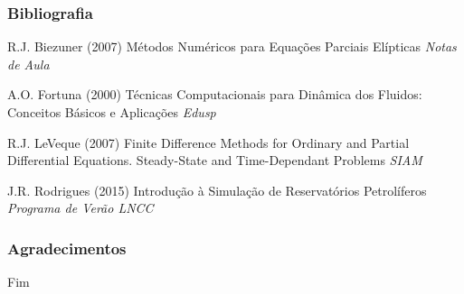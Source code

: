 \documentclass{beamer}
\begin{document}
\begin{frame}
\frametitle{Bibliografia}
\footnotesize{
\begin{thebibliography}{99} %
 R.J. Biezuner (2007)
\newblock Métodos Numéricos para Equações Parciais Elípticas
\newblock \emph{Notas de Aula}

 A.O. Fortuna (2000)
\newblock Técnicas Computacionais para Dinâmica dos Fluidos: Conceitos Básicos e Aplicações
\newblock \emph{Edusp}

 R.J. LeVeque (2007)
\newblock Finite Difference Methods for Ordinary and Partial Differential Equations. Steady-State and Time-Dependant Problems
\newblock \emph{SIAM}

 J.R. Rodrigues (2015)
\newblock Introdução à Simulação de Reservatórios Petrolíferos
\newblock \emph{Programa de Verão LNCC}
\end{thebibliography}
}
\end{frame}


\begin{frame}
  \frametitle{Agradecimentos}
  \centering
  \Huge{\centerline{Fim}}
\end{frame}

\end{document}
